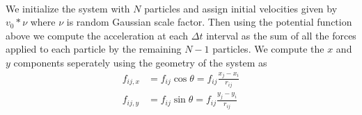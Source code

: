 \documentclass[11.5pt]{article}
\begin{document}
\paragraph{}
We initialize the system with $N$ particles and assign initial velocities given by $v_0*\nu$ where $\nu$ is random Gaussian scale factor. Then using the potential function above we compute the acceleration at each $\Delta t$ interval as the sum of all the forces applied to each particle by the remaining $N-1$ particles. We compute the $x$ and $y$ components seperately using the geometry of the system as
\begin{align*}
f_{ij,x} &= f_{ij}\cos \theta = f_{ij} \frac{x_j - x_i}{r_{ij}}\\
f_{ij,y} &= f_{ij}\sin \theta = f_{ij} \frac{y_j - y_i}{r_{ij}}
\end{align*}
\pagebreak
\end{document}
